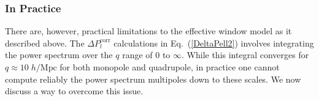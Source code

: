                                                                                                                                                                                                                                                                             \subsubsection{In Practice} \label{sec:tophat_practice}
                                                                                                                                                                                                                                                                            There are, however, practical limitations to the effective window model 
                                                                                                                                                                                                                                                                            as it described above. The 
                                                                                                                                                                                                                                                                            $\Delta P^\mathrm{corr}_l$ calculations in 
                                                                                                                                                                                                                                                                            Eq.~(\ref{DeltaPell2}) involves integrating the power spectrum over the $q$
                                                                                                                                                                                                                                                                            range of $0$ to $\infty$. While this integral converges for $q \approx10\;h/\mathrm{Mpc}$ 
                                                                                                                                                                                                                                                                            for both monopole and quadrupole, in practice one cannot compute reliably the power spectrum multipoles down to these scales. We now 
                                                                                                                                                                                                                                                                            discuss a way to overcome this issue.

